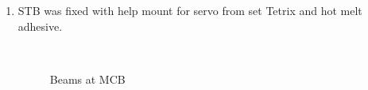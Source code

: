 \begin{enumerate}
\begin{enumerate}
		\item STB was fixed with help mount for servo from set Tetrix and hot melt adhesive.
	    \begin{figure}[H]
			\begin{minipage}[h]{0.47\linewidth}
				\caption{Beams at MCB}  
			\end{minipage}
			\hfill
			\begin{minipage}[h]{0.47\linewidth}

\end{minipage}
\end{figure}
\end{enumerate}
\end{enumerate}
